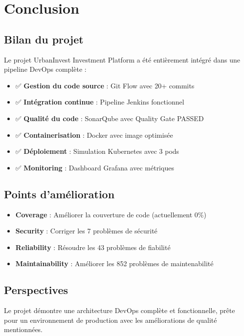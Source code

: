 \documentclass[12pt,a4paper]{article}
\begin{document}
\section{Conclusion}

\subsection{Bilan du projet}
Le projet UrbanInvest Investment Platform a été entièrement intégré dans une pipeline DevOps complète :

\begin{itemize}
    \item ✅ \textbf{Gestion du code source} : Git Flow avec 20+ commits
    \item ✅ \textbf{Intégration continue} : Pipeline Jenkins fonctionnel
    \item ✅ \textbf{Qualité du code} : SonarQube avec Quality Gate PASSED
    \item ✅ \textbf{Containerisation} : Docker avec image optimisée
    \item ✅ \textbf{Déploiement} : Simulation Kubernetes avec 3 pods
    \item ✅ \textbf{Monitoring} : Dashboard Grafana avec métriques
\end{itemize}

\subsection{Points d'amélioration}
\begin{itemize}
    \item \textbf{Coverage} : Améliorer la couverture de code (actuellement 0\%)
    \item \textbf{Security} : Corriger les 7 problèmes de sécurité
    \item \textbf{Reliability} : Résoudre les 43 problèmes de fiabilité
    \item \textbf{Maintainability} : Améliorer les 852 problèmes de maintenabilité
\end{itemize}

\subsection{Perspectives}
Le projet démontre une architecture DevOps complète et fonctionnelle, prête pour un environnement de production avec les améliorations de qualité mentionnées.
\end{document}
